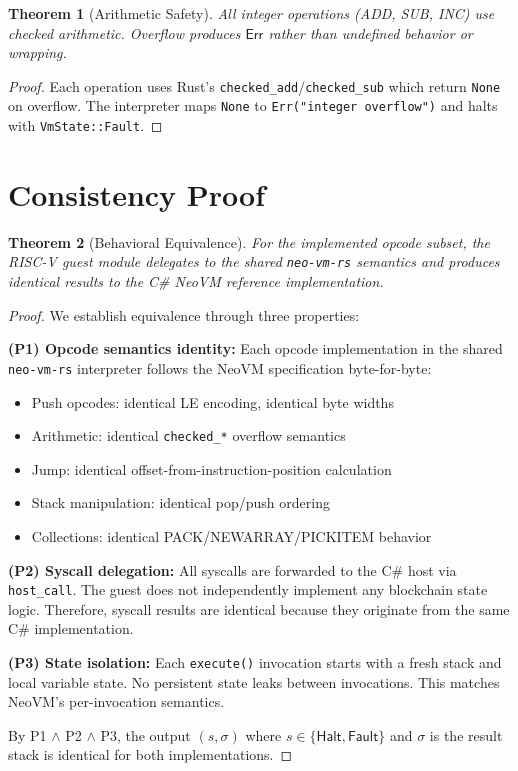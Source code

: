 \documentclass[11pt,a4paper]{article}
\newtheorem{theorem}{Theorem}[section]
\begin{document}
\begin{theorem}[Arithmetic Safety]
\label{thm:arith}
All integer operations (ADD, SUB, INC) use checked arithmetic. Overflow produces $\mathsf{Err}$ rather than undefined behavior or wrapping.
\end{theorem}

\begin{proof}
Each operation uses Rust's \texttt{checked\_add}/\texttt{checked\_sub} which return \texttt{None} on overflow. The interpreter maps \texttt{None} to \texttt{Err("integer overflow")} and halts with \texttt{VmState::Fault}.
\end{proof}

\section{Consistency Proof}

\begin{theorem}[Behavioral Equivalence]
\label{thm:equiv}
For the implemented opcode subset, the RISC-V guest module delegates to the shared \texttt{neo-vm-rs} semantics and produces identical results to the C\# NeoVM reference implementation.
\end{theorem}

\begin{proof}
We establish equivalence through three properties:

\textbf{(P1) Opcode semantics identity:} Each opcode implementation in the shared \texttt{neo-vm-rs} interpreter follows the NeoVM specification byte-for-byte:
\begin{itemize}
\item Push opcodes: identical LE encoding, identical byte widths
\item Arithmetic: identical \texttt{checked\_*} overflow semantics
\item Jump: identical offset-from-instruction-position calculation
\item Stack manipulation: identical pop/push ordering
\item Collections: identical PACK/NEWARRAY/PICKITEM behavior
\end{itemize}

\textbf{(P2) Syscall delegation:} All syscalls are forwarded to the C\# host via \texttt{host\_call}. The guest does not independently implement any blockchain state logic. Therefore, syscall results are identical because they originate from the same C\# implementation.

\textbf{(P3) State isolation:} Each \texttt{execute()} invocation starts with a fresh stack and local variable state. No persistent state leaks between invocations. This matches NeoVM's per-invocation semantics.

By P1 $\land$ P2 $\land$ P3, the output $(s, \sigma)$ where $s \in \{\mathsf{Halt}, \mathsf{Fault}\}$ and $\sigma$ is the result stack is identical for both implementations.
\end{proof}
\end{document}
